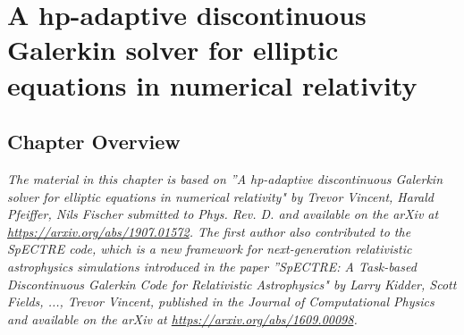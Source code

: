\chapter{A hp-adaptive discontinuous Galerkin solver for elliptic equations in numerical relativity}

\section{Chapter Overview}

\textit{The material in this chapter is based on ”A hp-adaptive discontinuous Galerkin solver for elliptic equations in numerical relativity" by Trevor Vincent, Harald Pfeiffer, Nils Fischer submitted to Phys. Rev. D. and available on the arXiv at \url{https://arxiv.org/abs/1907.01572}. The first author also contributed to the SpECTRE code, which is a new framework for next-generation relativistic astrophysics simulations introduced in the paper ”SpECTRE: A Task-based Discontinuous Galerkin Code for Relativistic Astrophysics" by Larry Kidder, Scott Fields, ..., Trevor Vincent, published in the Journal of Computational Physics and available on the arXiv at \url{https://arxiv.org/abs/1609.00098}.}

